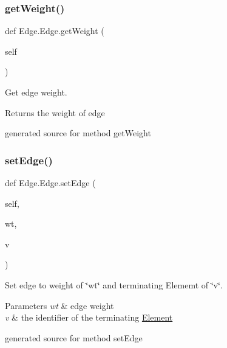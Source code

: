 \subsubsection{\texorpdfstring{get\+Weight()}{getWeight()}}
{\footnotesize\ttfamily def Edge.\+Edge.\+get\+Weight (\begin{DoxyParamCaption}\item[{}]{self }\end{DoxyParamCaption})}



Get edge weight. 

\begin{DoxyReturn}{Returns}
the weight of edge\begin{DoxyVerb}generated source for method getWeight \end{DoxyVerb}
 
\end{DoxyReturn}
\hypertarget{class_edge_1_1_edge_afe129e75ba6c6cb076ec6780e06e31be}{}\label{class_edge_1_1_edge_afe129e75ba6c6cb076ec6780e06e31be} 
\subsubsection{\texorpdfstring{set\+Edge()}{setEdge()}}
{\footnotesize\ttfamily def Edge.\+Edge.\+set\+Edge (\begin{DoxyParamCaption}\item[{}]{self,  }\item[{}]{wt,  }\item[{}]{v }\end{DoxyParamCaption})}



Set edge to weight of \char`\"{}wt\char`\"{} and terminating Elememt of \char`\"{}v\char`\"{}. 


\begin{DoxyParams}{Parameters}
{\em wt} & edge weight \\
\hline
{\em v} & the identifier of the terminating \hyperlink{namespace_element}{Element}\begin{DoxyVerb}generated source for method setEdge \end{DoxyVerb}
 \\
\hline
\end{DoxyParams}
\hypertarget{class_edge_1_1_edge_a07ec26da674c890cd63bc384a309f57a}{}\label{class_edge_1_1_edge_a07ec26da674c890cd63bc384a309f57a} 
